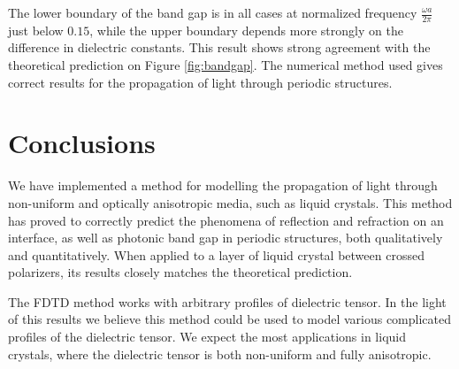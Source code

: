 \documentclass[a4paper,10pt]{article}
\begin{document}
\begin{multicols}{2}
The lower boundary of the band gap is in all cases at normalized frequency $\frac{\omega a}{2\pi}$ just below $0.15$, while the upper boundary depends more strongly on the difference in dielectric constants. 
This result shows strong agreement with the theoretical prediction on Figure \ref{fig:bandgap}. 
The numerical method used gives correct results for the propagation of light through periodic structures. 

\section{Conclusions}
We have implemented a method for modelling the propagation of light through non-uniform and optically anisotropic media, such as liquid crystals. 
This method has proved to correctly predict the phenomena of reflection and refraction on an interface, as well as photonic band gap in periodic structures, both qualitatively and quantitatively.  
When applied to a layer of liquid crystal between crossed polarizers, its results closely matches the theoretical prediction. 

The \textsc{FDTD} method works with arbitrary profiles of dielectric tensor. 
In the light of this results we believe this method could be used to model various complicated profiles of the dielectric tensor. 
We expect the most applications in liquid crystals, where the dielectric tensor is both non-uniform and fully anisotropic. 




\end{multicols}
\end{document}
